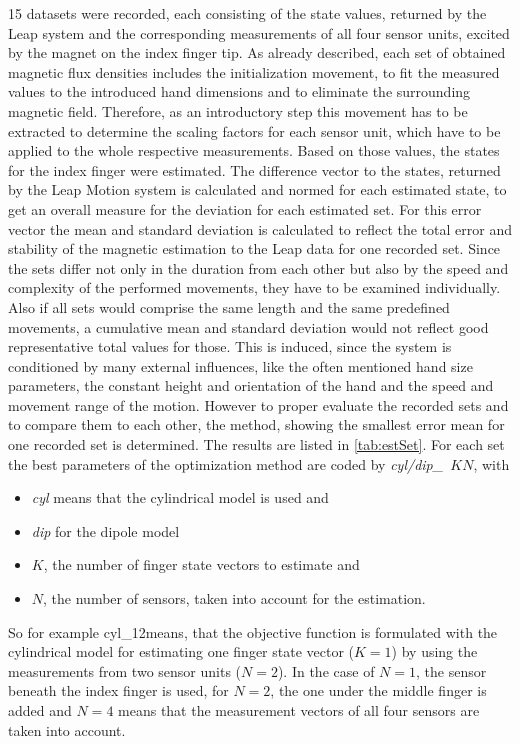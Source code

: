 15 datasets were recorded, each consisting of the state values, returned by the Leap system and the corresponding measurements of all four sensor units, excited by the magnet on the index finger tip. As already described, each set of obtained magnetic flux densities includes the initialization movement, to fit the measured values to the introduced hand dimensions and to eliminate the surrounding magnetic field. Therefore, as an introductory step this movement has to be extracted to determine the scaling factors for each sensor unit, which have to be applied to the whole respective measurements. Based on those values, the states for the index finger were estimated. The difference vector to the states, returned by the Leap Motion system is calculated and normed for each estimated state, to get an overall measure for the deviation for each estimated set. For this error vector the mean and standard deviation is calculated to reflect the total error and stability of the magnetic estimation to the Leap data for one recorded set. Since the sets differ not only in the duration from each other but also by the speed and complexity of the performed movements, they have to be examined individually. Also if all sets would comprise the same length and the same predefined movements, a cumulative mean and standard deviation would not reflect good representative total values for those. This is induced, since the system is conditioned by many external influences, like the often mentioned hand size parameters, the constant height and orientation of the hand and the speed and movement range of the motion. However to proper evaluate the recorded sets and to compare them to each other, the method, showing the smallest error mean for one recorded set is determined. The results are listed in \ref{tab:estSet}. For each set the best parameters of the optimization method are coded by \mbox{\emph{cyl/dip\_ $ K N $}}, with
\begin{itemize}
\item \emph{cyl} means that the cylindrical model is used and 
\item \emph{dip} for the dipole model
\item $ K $, the number of finger state vectors to estimate and
\item $ N $, the number of sensors, taken into account for the estimation.
\end{itemize}
So for example \grqq cyl\_12\grqq means, that the objective function is formulated with the cylindrical model for estimating one finger state vector ($ K = 1 $) by using the measurements from two sensor units ($ N = 2 $). In the case of $ N = 1 $, the sensor beneath the index finger is used, for $ N = 2 $, the one under the middle finger is added and $ N = 4 $ means that the measurement vectors of all four sensors are taken into account.
